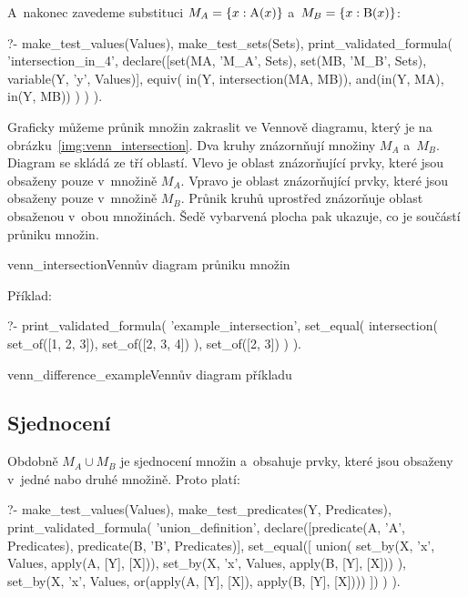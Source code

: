 A~nakonec zavedeme substituci \(M_A = \{x: \mathrm{A}(x)\}\) a~\(M_B = \{x: \mathrm{B}(x)\}\):
\begin{prolog}
?- 	make_test_values(Values),
	make_test_sets(Sets),
	print_validated_formula(
		'intersection_in_4',
		declare([set(MA, 'M_A', Sets), set(MB, 'M_B', Sets), variable(Y, 'y', Values)],
			equiv(
				in(Y, intersection(MA, MB)),
				and(in(Y, MA), in(Y, MB))
			)
		)
	).
\end{prolog}

Graficky můžeme průnik množin zakraslit ve Vennově diagramu, který je na obrázku~\ref{img:venn_intersection}. Dva kruhy znázornňují množiny \(M_A\) a~\(M_B\). Diagram se skládá ze tří oblastí. Vlevo je oblast znázorňující prvky, které jsou obsaženy pouze v~množině \(M_A\). Vpravo je oblast znázorňující prvky, které jsou obsaženy pouze v~množině \(M_B\). Průnik kruhů uprostřed znázorňuje oblast obsaženou v~obou množinách. Šedě vybarvená plocha pak ukazuje, co je součástí průniku množin.

\begin{fig}{venn_intersection}{Vennův diagram průniku množin}
\end{fig}

Příklad:

\begin{prolog}
?-	print_validated_formula(
		'example_intersection',
		set_equal(
			intersection(
				set_of([1, 2, 3]),
				set_of([2, 3, 4])
			),
			set_of([2, 3])
		)
	).
\end{prolog}

\begin{fig}{venn_difference_example}{Vennův diagram příkladu}
\end{fig}

\subsection{Sjednocení}

Obdobně \(M_A \cup M_B\) je sjednocení množin a~obsahuje prvky, které jsou obsaženy v~jedné nabo druhé množině. Proto platí:

\begin{prolog}
?- 	make_test_values(Values),
	make_test_predicates(Y, Predicates),
	print_validated_formula(
		'union_definition',
		declare([predicate(A, 'A', Predicates), predicate(B, 'B', Predicates)],
			set_equal([
				union(
					set_by(X, 'x', Values, apply(A, [Y], [X])),
					set_by(X, 'x', Values, apply(B, [Y], [X]))
				),
				set_by(X, 'x', Values, or(apply(A, [Y], [X]), apply(B, [Y], [X])))
			])
		)
	).
\end{prolog}


